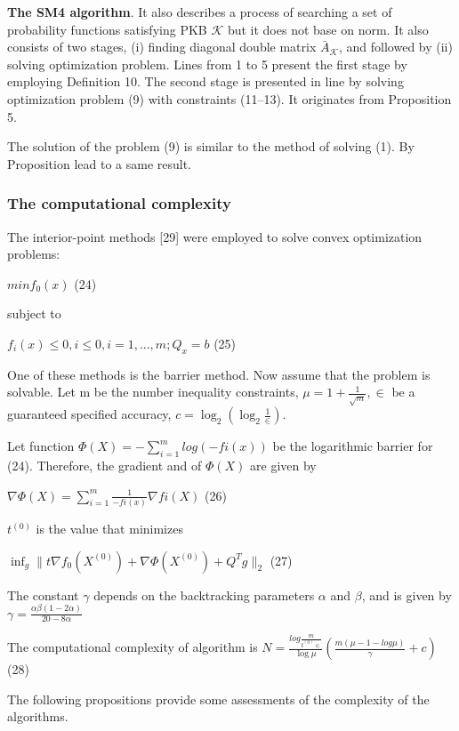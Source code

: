 \documentclass[]{iosart2c}
\begin{document}
  \textbf{The SM4 algorithm}. It also describes a process of searching a set of probability functions satisfying PKB $\mathcal{K}$ but it does not base on norm. It also consists of two stages, (i) finding diagonal double matrix $\bar{A}_\mathcal{K}$, and followed by (ii) solving optimization problem. Lines from 1 to 5 present the first stage by employing Definition 10. The second stage is presented in line by solving optimization problem (9) with constraints (11–13). It originates from Proposition 5.

  The solution of the problem (9) is similar to the method of solving (1). By Proposition lead to a same result.

  \subsubsection{The computational complexity}
  The interior-point methods [29] were employed to
  solve convex optimization problems:

  $min f_0(x)$ (24)

  subject to

  $f_i(x) \le 0, i \le 0, i = 1, ...,m;Q_x = b$ (25)

  One of these methods is the barrier method. Now assume that the problem is solvable. Let m be the number inequality constraints, $\mu = 1 + \frac{1}{\sqrt{m}}, \in$ be a
  guaranteed specified accuracy, $c = \log_2 (\log_2 \frac{1}{\in})$.

  Let function $\Phi(X) = -\sum^m_{i=1} log(-fi(x))$ be the
  logarithmic barrier for (24). Therefore, the gradient
  and of $\Phi(X)$ are given by

  $\nabla \Phi(X) = \sum^m_{i=1} \frac{1}{-fi(x)} \nabla fi(X)$ (26)

  $t^{(0)}$ is the value that minimizes

  $\inf_g \parallel t\nabla f_0 \left( X^{(0)} \right) + \nabla \Phi \left( X^{(0)} \right) + Q^T g \parallel _2$ (27)

  The constant $\gamma$ depends on the backtracking
  parameters $\alpha$ and $\beta$, and is given by $\gamma =  \frac{\alpha\beta(1-2\alpha)}{20-8\alpha}$

  The computational complexity of algorithm is
  $N = \frac{log \frac{m}{t^{(0)} \in}}{ \log\mu }
  \left( \frac{m(\mu - 1 - log\mu)}{\gamma} + c \right)$ (28)

  The following propositions provide some assessments of the complexity of the algorithms.
\end{document}
